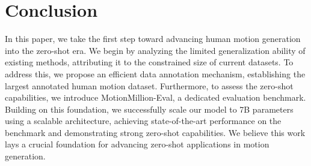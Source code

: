 \section{Conclusion}
In this paper, we take the first step toward advancing human motion generation into the zero-shot era. We begin by analyzing the limited generalization ability of existing methods, attributing it to the constrained size of current datasets. To address this, we propose an efficient data annotation mechanism, establishing the largest annotated human motion dataset. Furthermore, to assess the zero-shot capabilities, we introduce MotionMillion-Eval, a dedicated evaluation benchmark. Building on this foundation, we successfully scale our model to 7B parameters using a scalable architecture, achieving state-of-the-art performance on the benchmark and demonstrating strong zero-shot capabilities. We believe this work lays a crucial foundation for advancing zero-shot applications in motion generation.